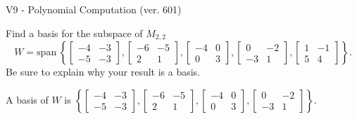 \begin{exercise}
  \begin{exerciseTitle}V9 - Polynomial Computation (ver. 601)\end{exerciseTitle}
  \begin{exerciseStatement}
    Find a basis for the subspace of \(M_{2,2}\) 
\[W=\mathrm{span}\ \left\{\left[\begin{array}{cc}
-4 & -3 \\
-5 & -3
\end{array}\right] , \left[\begin{array}{cc}
-6 & -5 \\
2 & 1
\end{array}\right] , \left[\begin{array}{cc}
-4 & 0 \\
0 & 3
\end{array}\right] , \left[\begin{array}{cc}
0 & -2 \\
-3 & 1
\end{array}\right] , \left[\begin{array}{cc}
1 & -1 \\
5 & 4
\end{array}\right]\right\}.\]
 Be sure to explain why your result is a basis.


  \end{exerciseStatement}
  \begin{exerciseAnswer}
   A basis of \(W\) is  \(\left\{\left[\begin{array}{cc}
-4 & -3 \\
-5 & -3
\end{array}\right] , \left[\begin{array}{cc}
-6 & -5 \\
2 & 1
\end{array}\right] , \left[\begin{array}{cc}
-4 & 0 \\
0 & 3
\end{array}\right] , \left[\begin{array}{cc}
0 & -2 \\
-3 & 1
\end{array}\right]\right\}\).
  


  \end{exerciseAnswer}
\end{exercise}